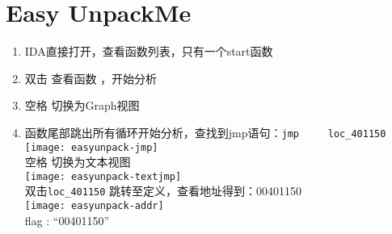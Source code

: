 \section{Easy UnpackMe}
\begin{enumerate}
\item IDA直接打开，查看函数列表，只有一个start函数 \\
\item 双击 查看函数 ，开始分析\\
\item 空格 切换为Graph视图 \\
\item 函数尾部跳出所有循环开始分析，查找到jmp语句：\lstinline$jmp     loc_401150$ \\
	\texttt{[image: easyunpack-jmp]} \\
	空格 切换为文本视图 \\
	\texttt{[image: easyunpack-textjmp]} \\
	双击\lstinline$loc_401150$ 跳转至定义，查看地址得到：00401150 \\
	\texttt{[image: easyunpack-addr]} \\
	flag : ``00401150''
\end{enumerate}